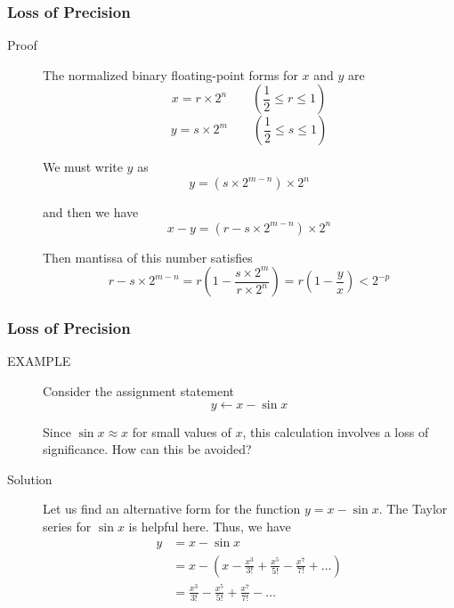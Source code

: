 \documentclass[notheorems,mathserif,table,compress]{beamer}  %
\begin{document}
\begin{frame}
\frametitle{Loss of Precision}
\begin{description}
\item[Proof] The normalized binary floating-point forms for $x$ and $y$ are 
\begin{displaymath}
x=r\times 2^n\qquad(\frac{1}{2}\leq r \leq 1)
\end{displaymath}
\begin{displaymath}
y=s\times 2^m\qquad(\frac{1}{2}\leq s \leq 1)
\end{displaymath}

We must write $y$ as 
\begin{displaymath}
y=(s\times2^{m-n})\times2^n
\end{displaymath}

and then we have
\begin{displaymath}
x-y=(r-s\times2^{m-n})\times2^n
\end{displaymath}

Then mantissa of this number satisfies
\begin{displaymath}
r-s\times2^{m-n}=r(1-\frac{s\times2^m}{r\times2^n})=r(1-\frac{y}{x})<2^{-p}
\end{displaymath}

\end{description}
\end{frame}

\begin{frame}
\frametitle{Loss of Precision}
\begin{description}
\item[EXAMPLE] Consider the assignment statement
\begin{displaymath}
y\leftarrow x-\sin x
\end{displaymath} 

Since $\sin x\approx x$ for small values of $x$, this calculation involves a loss of significance. How can this be avoided?
\item[Solution] Let us find an alternative form for the function $y=x-\sin x$. The Taylor series for $\sin x$ is helpful here. Thus, we have 
\begin{equation*}
\begin{split}
 y& =x-\sin x \\
  & =x-(x-\frac{x^3}{3!}+\frac{x^5}{5!}-\frac{x^7}{7!}+\ldots)\\
  & =\frac{x^3}{3!}-\frac{x^5}{5!}+\frac{x^7}{7!}-\ldots
\end{split}
\end{equation*}

\end{description}
\end{frame}
\end{document}
